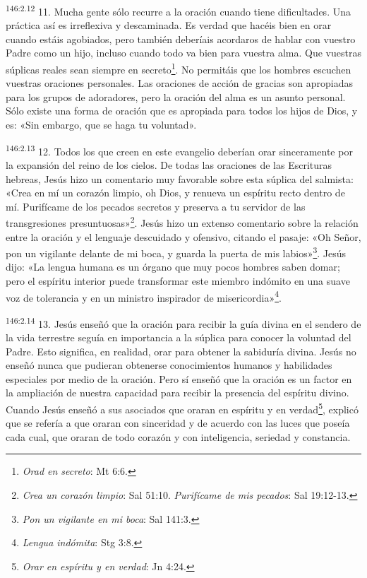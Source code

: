 \par
\textsuperscript{146:2.12} 11. Mucha gente sólo recurre a la oración cuando tiene dificultades. Una práctica así es irreflexiva y descaminada. Es verdad que hacéis bien en orar cuando estáis agobiados, pero también deberíais acordaros de hablar con vuestro Padre como un hijo, incluso cuando todo va bien para vuestra alma. Que vuestras súplicas reales sean siempre en secreto\footnote{\textit{Orad en secreto}: Mt 6:6.}. No permitáis que los hombres escuchen vuestras oraciones personales. Las oraciones de acción de gracias son apropiadas para los grupos de adoradores, pero la oración del alma es un asunto personal. Sólo existe una forma de oración que es apropiada para todos los hijos de Dios, y es: «Sin embargo, que se haga tu voluntad».

\par
\textsuperscript{146:2.13} 12. Todos los que creen en este evangelio deberían orar sinceramente por la expansión del reino de los cielos. De todas las oraciones de las Escrituras hebreas, Jesús hizo un comentario muy favorable sobre esta súplica del salmista: «Crea en mí un corazón limpio, oh Dios, y renueva un espíritu recto dentro de mí. Purifícame de los pecados secretos y preserva a tu servidor de las transgresiones presuntuosas»\footnote{\textit{Crea un corazón limpio}: Sal 51:10. \textit{Purifícame de mis pecados}: Sal 19:12-13.}. Jesús hizo un extenso comentario sobre la relación entre la oración y el lenguaje descuidado y ofensivo, citando el pasaje: «Oh Señor, pon un vigilante delante de mi boca, y guarda la puerta de mis labios»\footnote{\textit{Pon un vigilante en mi boca}: Sal 141:3.}. Jesús dijo: «La lengua humana es un órgano que muy pocos hombres saben domar; pero el espíritu interior puede transformar este miembro indómito en una suave voz de tolerancia y en un ministro inspirador de misericordia»\footnote{\textit{Lengua indómita}: Stg 3:8.}.

\par
\textsuperscript{146:2.14} 13. Jesús enseñó que la oración para recibir la guía divina en el sendero de la vida terrestre seguía en importancia a la súplica para conocer la voluntad del Padre. Esto significa, en realidad, orar para obtener la sabiduría divina. Jesús no enseñó nunca que pudieran obtenerse conocimientos humanos y habilidades especiales por medio de la oración. Pero sí enseñó que la oración es un factor en la ampliación de nuestra capacidad para recibir la presencia del espíritu divino. Cuando Jesús enseñó a sus asociados que oraran en espíritu y en verdad\footnote{\textit{Orar en espíritu y en verdad}: Jn 4:24.}, explicó que se refería a que oraran con sinceridad y de acuerdo con las luces que poseía cada cual, que oraran de todo corazón y con inteligencia, seriedad y constancia.

